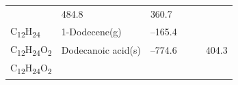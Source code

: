 \documentclass[
  9pt,
]{extbook}
\theoremstyle{definition}
\theoremstyle{definition}
\theoremstyle{definition}
\theoremstyle{remark}
\begin{document}
\begin{longtable}[]{@{}llllll@{}}
\begin{minipage}[t]{0.15\columnwidth}
\strut
\end{minipage} & \begin{minipage}[t]{0.14\columnwidth}\raggedright
484.8\strut
\end{minipage} & \begin{minipage}[t]{0.14\columnwidth}\raggedright
360.7\strut
\end{minipage}\tabularnewline
\begin{minipage}[t]{0.07\columnwidth}\raggedright
C\textsubscript{12}H\textsubscript{24}\strut
\end{minipage} & \begin{minipage}[t]{0.17\columnwidth}\raggedright
1-Dodecene(g)\strut
\end{minipage} & \begin{minipage}[t]{0.15\columnwidth}\raggedright
--165.4\strut
\end{minipage} & \begin{minipage}[t]{0.15\columnwidth}\raggedright
\strut
\end{minipage} & \begin{minipage}[t]{0.14\columnwidth}\raggedright
\strut
\end{minipage} & \begin{minipage}[t]{0.14\columnwidth}\raggedright
\strut
\end{minipage}\tabularnewline
\begin{minipage}[t]{0.07\columnwidth}\raggedright
C\textsubscript{12}H\textsubscript{24}O\textsubscript{2}\strut
\end{minipage} & \begin{minipage}[t]{0.17\columnwidth}\raggedright
Dodecanoic acid(s)\strut
\end{minipage} & \begin{minipage}[t]{0.15\columnwidth}\raggedright
--774.6\strut
\end{minipage} & \begin{minipage}[t]{0.15\columnwidth}\raggedright
\strut
\end{minipage} & \begin{minipage}[t]{0.14\columnwidth}\raggedright
\strut
\end{minipage} & \begin{minipage}[t]{0.14\columnwidth}\raggedright
404.3\strut
\end{minipage}\tabularnewline
\begin{minipage}[t]{0.07\columnwidth}\raggedright
C\textsubscript{12}H\textsubscript{24}O\textsubscript{2}\strut
\end{minipage} & \begin{minipage}[t]{0.17\columnwidth}\raggedright

\end{minipage}
\end{longtable}
\end{document}
